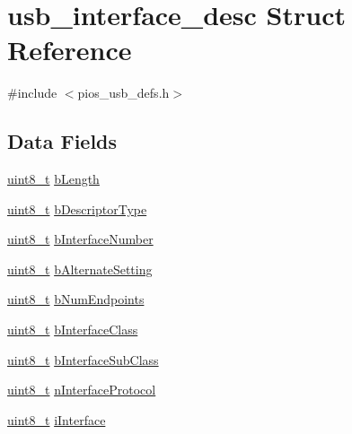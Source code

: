 \hypertarget{structusb__interface__desc}{\section{usb\-\_\-interface\-\_\-desc Struct Reference}
\label{structusb__interface__desc}
}


{\ttfamily \#include $<$pios\-\_\-usb\-\_\-defs.\-h$>$}

\subsection*{Data Fields}
\begin{DoxyCompactItemize}
\item 
\hyperlink{stdint_8h_aba7bc1797add20fe3efdf37ced1182c5}{uint8\-\_\-t} \hyperlink{group___p_i_o_s___u_s_b___d_e_f_s_gaa4b60d12645813f528deae9301fe2103}{b\-Length}
\item 
\hyperlink{stdint_8h_aba7bc1797add20fe3efdf37ced1182c5}{uint8\-\_\-t} \hyperlink{group___p_i_o_s___u_s_b___d_e_f_s_ga324795326b03fff1d5c298b8dde76dc9}{b\-Descriptor\-Type}
\item 
\hyperlink{stdint_8h_aba7bc1797add20fe3efdf37ced1182c5}{uint8\-\_\-t} \hyperlink{group___p_i_o_s___u_s_b___d_e_f_s_ga18e33c3c1b7bf4ea4cff62e4d603afd9}{b\-Interface\-Number}
\item 
\hyperlink{stdint_8h_aba7bc1797add20fe3efdf37ced1182c5}{uint8\-\_\-t} \hyperlink{group___p_i_o_s___u_s_b___d_e_f_s_ga9fd5069255e2ed4e8c8bee39fd5c3e19}{b\-Alternate\-Setting}
\item 
\hyperlink{stdint_8h_aba7bc1797add20fe3efdf37ced1182c5}{uint8\-\_\-t} \hyperlink{group___p_i_o_s___u_s_b___d_e_f_s_ga685562326d8af1c5eccd71bdb2794cd1}{b\-Num\-Endpoints}
\item 
\hyperlink{stdint_8h_aba7bc1797add20fe3efdf37ced1182c5}{uint8\-\_\-t} \hyperlink{group___p_i_o_s___u_s_b___d_e_f_s_ga01e526f1b9ab4ee18ebeb28b17a5f7e8}{b\-Interface\-Class}
\item 
\hyperlink{stdint_8h_aba7bc1797add20fe3efdf37ced1182c5}{uint8\-\_\-t} \hyperlink{group___p_i_o_s___u_s_b___d_e_f_s_gaf937eb2ea941b0470ccd69ae9c5478ac}{b\-Interface\-Sub\-Class}
\item 
\hyperlink{stdint_8h_aba7bc1797add20fe3efdf37ced1182c5}{uint8\-\_\-t} \hyperlink{group___p_i_o_s___u_s_b___d_e_f_s_ga1e2e09e7b88f6a84a53129afefdc75d3}{n\-Interface\-Protocol}
\item 
\hyperlink{stdint_8h_aba7bc1797add20fe3efdf37ced1182c5}{uint8\-\_\-t} \hyperlink{group___p_i_o_s___u_s_b___d_e_f_s_ga93404aa8e9b859c2759b7a02b6533222}{i\-Interface}
\end{DoxyCompactItemize}


